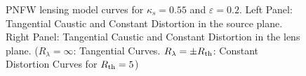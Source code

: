 \begin{figure}[!ht]
\caption{\label{pnfw_curves_pm-2} PNFW lensing model curves for $\kappa_s=0.55$
and $\varepsilon=0.2$. Left Panel: Tangential Caustic and Constant Distortion in
the source plane. Right Panel: Tangential Caustic and Constant Distortion in the
lens plane. ($R_\lambda=\infty$: Tangential Curves. $R_\lambda=\pm R_{\rm th}$:
Constant Distortion Curves for $R_{\rm th}=5$)}
\end{figure}

